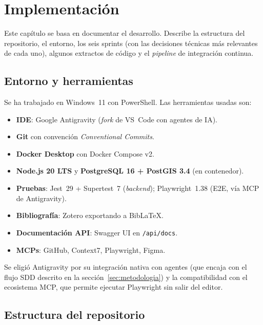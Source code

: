 \chapter{Implementación}
\label{ch:implementacion}

Este capítulo se basa en documentar el desarrollo. Describe la estructura del repositorio, el entorno, los seis sprints (con las decisiones técnicas más relevantes de cada uno), algunos extractos de código y el \textit{pipeline} de integración continua.


\section{Entorno y herramientas}
\label{sec:entorno}

Se ha trabajado en Windows~11 con PowerShell. Las herramientas usadas son:

\begin{itemize}
  \item \textbf{IDE}: Google Antigravity (\textit{fork} de VS~Code con agentes de IA).
  \item \textbf{Git} con convención \textit{Conventional Commits}.
  \item \textbf{Docker Desktop} con Docker Compose v2.
  \item \textbf{Node.js 20 LTS} y \textbf{PostgreSQL 16 + PostGIS 3.4} (en contenedor).
  \item \textbf{Pruebas}: Jest~29 + Supertest~7 (\textit{backend}); Playwright~1.38 (E2E, vía MCP de Antigravity).
  \item \textbf{Bibliografía}: Zotero exportando a BibLaTeX.
  \item \textbf{Documentación API}: Swagger UI en \texttt{/api/docs}.
  \item \textbf{MCPs}: GitHub, Context7, Playwright, Figma.
\end{itemize}

Se eligió Antigravity por su integración nativa con agentes (que encaja con el flujo SDD descrito en la sección~\ref{sec:metodologia}) y la compatibilidad con el ecosistema MCP, que permite ejecutar Playwright sin salir del editor.


\section{Estructura del repositorio}
\label{sec:estructura-repo}

